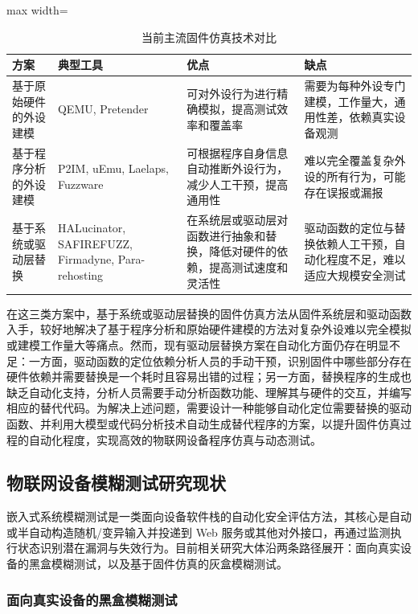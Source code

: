 \begin{table}[htbp]
\centering
\caption{当前主流固件仿真技术对比}
\label{tab:sim_comparison}
\footnotesize
\begin{adjustbox}{max width=\textwidth}
\begin{tabular}{p{2.2cm}p{2.5cm}p{4cm}p{4cm}}
\toprule
\textbf{方案} & \textbf{典型工具} & \textbf{优点} & \textbf{缺点} \\
\midrule
基于原始硬件的外设建模 & QEMU, Pretender & 可对外设行为进行精确模拟，提高测试效率和覆盖率 & 需要为每种外设专门建模，工作量大，通用性差，依赖真实设备观测 \\
\midrule
基于程序分析的外设建模 & P2IM, uEmu, Laelaps, Fuzzware & 可根据程序自身信息自动推断外设行为，减少人工干预，提高通用性 & 难以完全覆盖复杂外设的所有行为，可能存在误报或漏报 \\
\midrule
基于系统或驱动层替换 & HALucinator, SAFIREFUZZ, Firmadyne, Para-rehosting & 在系统层或驱动层对函数进行抽象和替换，降低对硬件的依赖，提高测试速度和灵活性 & 驱动函数的定位与替换依赖人工干预，自动化程度不足，难以适应大规模安全测试 \\
\bottomrule
\end{tabular}
\end{adjustbox}
\end{table}

在这三类方案中，基于系统或驱动层替换的固件仿真方法从固件系统层和驱动函数入手，较好地解决了基于程序分析和原始硬件建模的方法对复杂外设难以完全模拟或建模工作量大等痛点。然而，现有驱动层替换方案在自动化方面仍存在明显不足：一方面，驱动函数的定位依赖分析人员的手动干预，识别固件中哪些部分存在硬件依赖并需要替换是一个耗时且容易出错的过程；另一方面，替换程序的生成也缺乏自动化支持，分析人员需要手动分析函数功能、理解其与硬件的交互，并编写相应的替代代码。为解决上述问题，需要设计一种能够自动化定位需要替换的驱动函数、并利用大模型或代码分析技术自动生成替代程序的方案，以提升固件仿真过程的自动化程度，实现高效的物联网设备程序仿真与动态测试。

\subsection{物联网设备模糊测试研究现状}
\label{sec:embedded_fuzz}

嵌入式系统模糊测试是一类面向设备软件栈的自动化安全评估方法，其核心是自动或半自动构造随机/变异输入并投递到 Web 服务或其他对外接口，再通过监测执行状态识别潜在漏洞与失效行为。目前相关研究大体沿两条路径展开：面向真实设备的黑盒模糊测试，以及基于固件仿真的灰盒模糊测试。

\subsubsection{面向真实设备的黑盒模糊测试}

